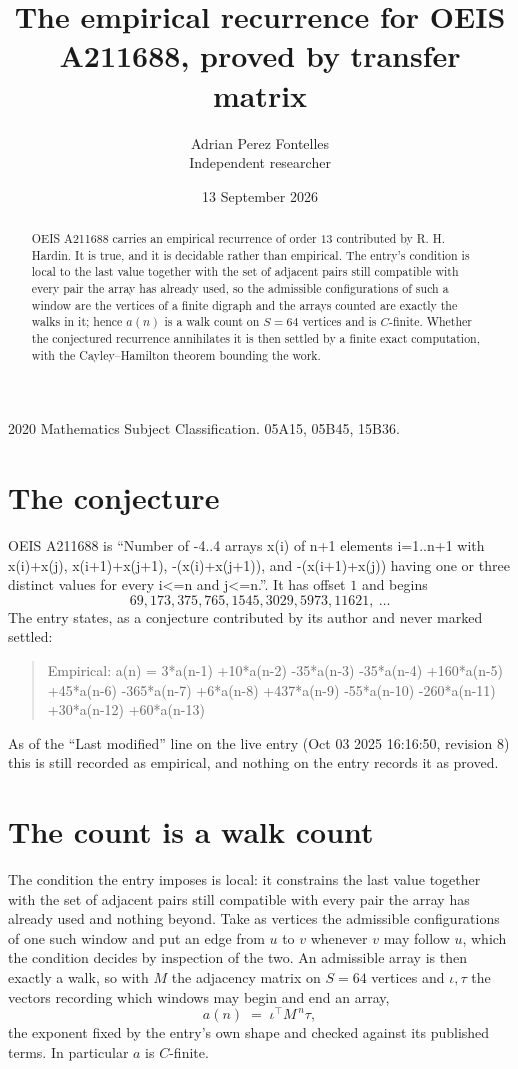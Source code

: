 \documentclass[11pt,a4paper]{article}
\title{The empirical recurrence for OEIS A211688, proved by transfer matrix}
\author{Adrian Perez Fontelles\\ \small Independent researcher}
\date{13 September 2026}
\theoremstyle{plain}
\theoremstyle{definition}
\begin{document}
\maketitle

\begin{abstract}
OEIS A211688 carries an empirical recurrence of order $13$ contributed by R. H. Hardin. It is
true, and it is decidable rather than empirical. The entry's condition is local to the last value together with the set of adjacent pairs still compatible with every pair the array has already used, so
the admissible configurations of such a window are the vertices of a finite digraph and the
arrays counted are exactly the walks in it; hence $a(n)$ is a walk count on $S=64$ vertices
and is $C$-finite. Whether the conjectured recurrence annihilates it is then settled by a
finite exact computation, with the Cayley--Hamilton theorem bounding the work.
\end{abstract}

\noindent\small 2020 Mathematics Subject Classification. 05A15, 05B45, 15B36.\normalsize

\section{The conjecture}

OEIS A211688 is ``Number of -4..4 arrays x(i) of n+1 elements i=1..n+1 with x(i)+x(j), x(i+1)+x(j+1), -(x(i)+x(j+1)), and -(x(i+1)+x(j)) having one or three distinct values for every i<=n and j<=n.''. It has offset $1$ and begins
\[
69, 173, 375, 765, 1545, 3029, 5973, 11621,\ \dots
\]
The entry states, as a conjecture contributed by its author and never marked settled:
\begin{quote}
Empirical: a(n) = 3*a(n-1) +10*a(n-2) -35*a(n-3) -35*a(n-4) +160*a(n-5) +45*a(n-6) -365*a(n-7) +6*a(n-8) +437*a(n-9) -55*a(n-10) -260*a(n-11) +30*a(n-12) +60*a(n-13)
\end{quote}
As of the ``Last modified'' line on the live entry (Oct 03 2025 16:16:50, revision 8) this is still
recorded as empirical, and nothing on the entry records it as proved.

\section{The count is a walk count}

The condition the entry imposes is local: it constrains the last value together with the set of adjacent pairs still compatible with every pair the array has already used and nothing beyond. Take as
vertices the admissible configurations of one such window and put an edge from $u$ to $v$
whenever $v$ may follow $u$, which the condition decides by inspection of the two. An
admissible array is then exactly a walk, so with $M$ the adjacency matrix on $S=64$ vertices
and $\iota,\tau$ the vectors recording which windows may begin and end an array,
\[
a(n)\;=\;\iota^{\!\top}M^{\,n}\tau ,
\]
the exponent fixed by the entry's own shape and checked against its published terms. In
particular $a$ is $C$-finite.
\end{document}
